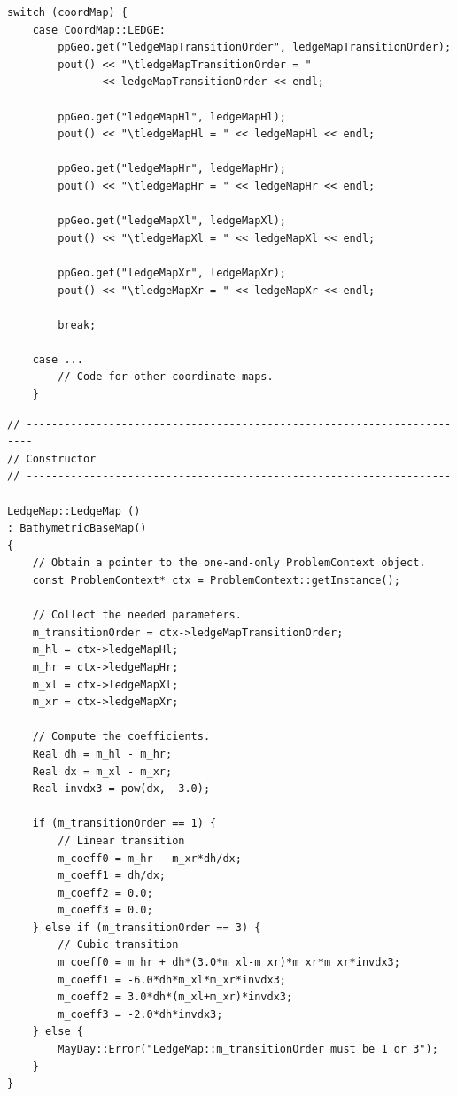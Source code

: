 \documentclass[12pt]{article}
\begin{document}
\begin{lstlisting}[caption={This actually performs the IO and should be placed in the \texttt{readGeometry()} function of \texttt{ProblemContext.cpp}.}]
	switch (coordMap) {
	case CoordMap::LEDGE:
		ppGeo.get("ledgeMapTransitionOrder", ledgeMapTransitionOrder);
		pout() << "\tledgeMapTransitionOrder = "
			   << ledgeMapTransitionOrder << endl;

		ppGeo.get("ledgeMapHl", ledgeMapHl);
		pout() << "\tledgeMapHl = " << ledgeMapHl << endl;

		ppGeo.get("ledgeMapHr", ledgeMapHr);
		pout() << "\tledgeMapHr = " << ledgeMapHr << endl;

		ppGeo.get("ledgeMapXl", ledgeMapXl);
		pout() << "\tledgeMapXl = " << ledgeMapXl << endl;

		ppGeo.get("ledgeMapXr", ledgeMapXr);
		pout() << "\tledgeMapXr = " << ledgeMapXr << endl;

		break;

	case ...
		// Code for other coordinate maps.
    }
\end{lstlisting}

\begin{lstlisting}[caption={The new \texttt{LedgeMap} constructor.}]
// -----------------------------------------------------------------------
// Constructor
// -----------------------------------------------------------------------
LedgeMap::LedgeMap ()
: BathymetricBaseMap()
{
	// Obtain a pointer to the one-and-only ProblemContext object.
    const ProblemContext* ctx = ProblemContext::getInstance();

	// Collect the needed parameters.
    m_transitionOrder = ctx->ledgeMapTransitionOrder;
    m_hl = ctx->ledgeMapHl;
    m_hr = ctx->ledgeMapHr;
    m_xl = ctx->ledgeMapXl;
    m_xr = ctx->ledgeMapXr;

	// Compute the coefficients.
    Real dh = m_hl - m_hr;
    Real dx = m_xl - m_xr;
    Real invdx3 = pow(dx, -3.0);

    if (m_transitionOrder == 1) {
        // Linear transition
        m_coeff0 = m_hr - m_xr*dh/dx;
        m_coeff1 = dh/dx;
        m_coeff2 = 0.0;
        m_coeff3 = 0.0;
    } else if (m_transitionOrder == 3) {
        // Cubic transition
        m_coeff0 = m_hr + dh*(3.0*m_xl-m_xr)*m_xr*m_xr*invdx3;
        m_coeff1 = -6.0*dh*m_xl*m_xr*invdx3;
        m_coeff2 = 3.0*dh*(m_xl+m_xr)*invdx3;
        m_coeff3 = -2.0*dh*invdx3;
    } else {
        MayDay::Error("LedgeMap::m_transitionOrder must be 1 or 3");
    }
}
\end{lstlisting}
\end{document}
